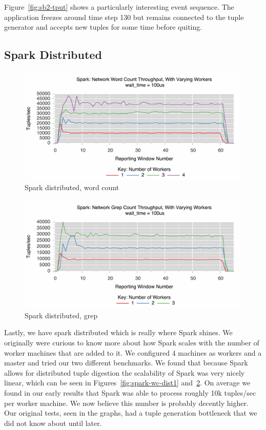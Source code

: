 Figure~\ref{fig:sb2-tput} shows a particularly interesting event sequence. The 
application freezes around time step 130 but remains connected to the tuple generator
and accepts new tuples for some time before quiting.

\subsection{Spark Distributed}
\label{ssec:spark-dist1}

\begin{figure}[t]
\centering
\includegraphics[width=1\linewidth]{figures/spark-wc-dist.pdf}
\caption{Spark distributed, word count}
\label{fig:spark-wc-dist}
\end{figure}


\begin{figure}[t]
\centering
\includegraphics[width=1\linewidth]{figures/spark-grep-dist.pdf}
\caption{Spark distributed, grep}
\label{fig:spark-grep-dist}
\end{figure}

Lastly, we have spark distributed which is really where Spark shines. We
originally were curious to know more about how Spark scales with the number of
worker machines that are added to it. We configured 4 machines as workers and a
master and tried our two different benchmarks. We found that because Spark
allows for distributed tuple digestion the scalability of Spark was very nicely
linear, which can be seen in Figures~\ref{fig:spark-wc-dist1}
and~\ref{fig:spark-grep-dist}. On average we found in our early results that
Spark was able to process roughly 10k tuples/sec per worker machine. We now
believe this number is probably decently higher. Our original tests, seen in
the graphs, had a tuple generation bottleneck that we did not know about until
later.


